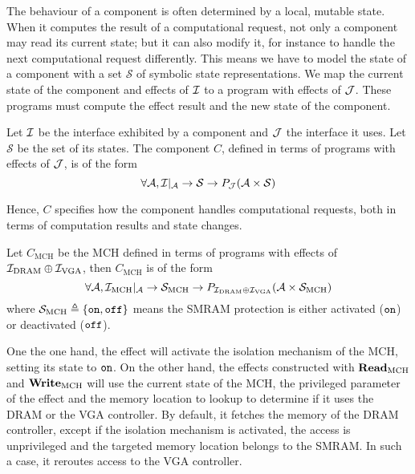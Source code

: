 The behaviour of a component is often determined by a local, mutable state.
%
When it computes the result of a computational request, not only a component may
read its current state; but it can also modify it, for instance to handle the
next computational request differently.
%
This means we have to model the state of a component with a set $\mathcal{S}$ of
symbolic state representations.
%
We map the current state of the component and effects of $\mathcal{I}$ to a program with
effects of $\mathcal{J}$.
%
These programs must compute the effect result and the new state of the
component.

\begin{definition}[Component] \label{def:freespec:component-model}
  Let $\mathcal{I}$ be the interface exhibited by a component and $\mathcal{J}$ the
  interface it uses.
  Let $\mathcal{S}$ be the set of its states.
  The component $C$, defined in terms of programs with effects of $\mathcal{J}$, is of
    the form \[ \forall \mathcal{A}, \mathcal{I}|_{\mathcal{A}} \rightarrow
    \mathcal{S} \rightarrow P_{\mathcal{J}}(\mathcal{A} \times \mathcal{S}) \]
\end{definition}

Hence, $C$ specifies how the component handles computational requests, both in
terms of computation results and state changes.

\begin{example} \label{ex:mch-specs}
  Let $C_{\mathrm{MCH}}$ be the MCH defined in terms of programs with effects of
  $\mathcal{I}_{\mathrm{DRAM}} \oplus \mathcal{I}_{\mathrm{VGA}}$, then $C_{\mathrm{MCH}}$ is of
  the form
  \[
    \forall \mathcal{A}, \mathcal{I}_{\mathrm{MCH}}|_{\mathcal{A}} \rightarrow
    \mathcal{S}_{\mathrm{MCH}} \rightarrow P_{\mathcal{I}_{\mathrm{DRAM}} \oplus \mathcal{I}_{\mathrm{VGA}}}(\mathcal{A}
    \times \mathcal{S}_{\mathrm{MCH}})
  \] where $\mathcal{S}_{\mathrm{MCH}} \triangleq \{ \mathtt{on}, \mathtt{off} \}$ means
  the SMRAM protection is either activated ($\mathtt{on}$) or deactivated
  ($\mathtt{off}$).

  One the one hand, the  effect will activate the isolation
  mechanism of the MCH, setting its state to $\mathtt{on}$.
  On the other hand, the effects constructed with $\mathbf{\mathbf{Read}}_{\mathrm{MCH}}$ and $\mathbf{\mathbf{Write}}_{\mathrm{MCH}}$
  will use the current state of the MCH, the privileged parameter of the
  effect and the memory location to lookup to determine if it uses the DRAM
  or the VGA controller.
  By default, it fetches the memory of the DRAM controller, except if the
  isolation mechanism is activated, the access is unprivileged and the targeted
  memory location belongs to the SMRAM.
  In such a case, it reroutes access to the VGA controller.
\end{example}

